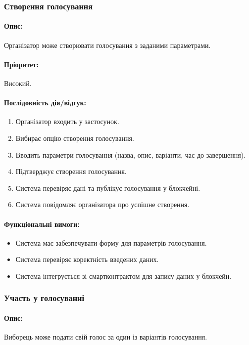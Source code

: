 \documentclass[14pt]{extreport}
\newcounter{req}[subsubsection]
\newcommand\req{\arabic{req}\stepcounter{req}}
\begin{document}
  \subsubsection{Створення голосування}  
  \paragraph{Опис:} Організатор може створювати голосування з заданими параметрами.  
  \paragraph{Пріоритет:} Високий.  
  \paragraph{Послідовність дія/відгук:}  
  \begin{enumerate}  
      \item Організатор входить у застосунок.  
      \item Вибирає опцію створення голосування.  
      \item Вводить параметри голосування (назва, опис, варіанти, час до завершення).  
      \item Підтверджує створення голосування.  
      \item Система перевіряє дані та публікує голосування у блокчейні.  
      \item Система повідомляє організатора про успішне створення.  
  \end{enumerate}
  \paragraph{Функціональні вимоги:}
  \begin{itemize}[leftmargin=*,label=REQ-.\req:]  
      \item Система має забезпечувати форму для параметрів голосування.
      \item Система перевіряє коректність введених даних.
      \item Система інтегрується зі смартконтрактом для запису даних у блокчейн.  
  \end{itemize}

  \subsubsection{Участь у голосуванні}  
  \paragraph{Опис:} Виборець може подати свій голос за один із варіантів голосування.  
\end{document}
